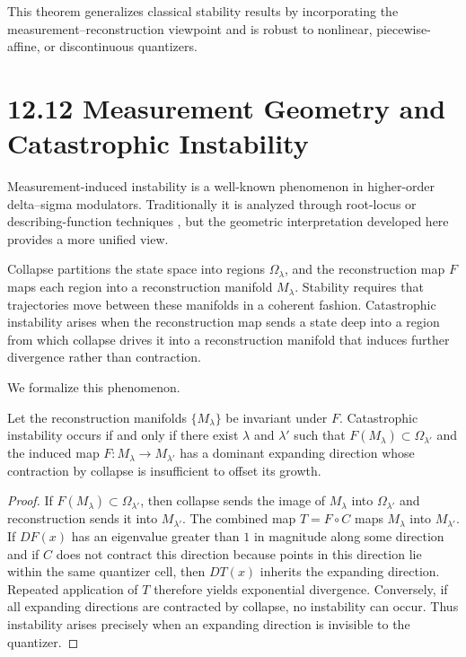 This theorem generalizes classical stability results by incorporating the measurement--reconstruction viewpoint and is robust to nonlinear, piecewise-affine, or discontinuous quantizers.

\section*{12.12 Measurement Geometry and Catastrophic Instability}

Measurement-induced instability is a well-known phenomenon in higher-order delta--sigma modulators. Traditionally it is analyzed through root-locus or describing-function techniques \cite{schreier2005understanding}, but the geometric interpretation developed here provides a more unified view.

Collapse partitions the state space into regions $\Omega_{\lambda}$, and the reconstruction map $F$ maps each region into a reconstruction manifold $M_{\lambda}$. Stability requires that trajectories move between these manifolds in a coherent fashion. Catastrophic instability arises when the reconstruction map sends a state deep into a region from which collapse drives it into a reconstruction manifold that induces further divergence rather than contraction.

We formalize this phenomenon.

\begin{theorem}
Let the reconstruction manifolds $\{M_{\lambda}\}$ be invariant under $F$. Catastrophic instability occurs if and only if there exist $\lambda$ and $\lambda'$ such that $F(M_{\lambda}) \subset \Omega_{\lambda'}$ and the induced map $F : M_{\lambda} \to M_{\lambda'}$ has a dominant expanding direction whose contraction by collapse is insufficient to offset its growth.
\end{theorem}

\begin{proof}
If $F(M_{\lambda}) \subset \Omega_{\lambda'}$, then collapse sends the image of $M_{\lambda}$ into $\Omega_{\lambda'}$ and reconstruction sends it into $M_{\lambda'}$. The combined map $T = F \circ C$ maps $M_{\lambda}$ into $M_{\lambda'}$. If $DF(x)$ has an eigenvalue greater than $1$ in magnitude along some direction and if $C$ does not contract this direction because points in this direction lie within the same quantizer cell, then $DT(x)$ inherits the expanding direction. Repeated application of $T$ therefore yields exponential divergence. Conversely, if all expanding directions are contracted by collapse, no instability can occur. Thus instability arises precisely when an expanding direction is invisible to the quantizer.
\end{proof}

